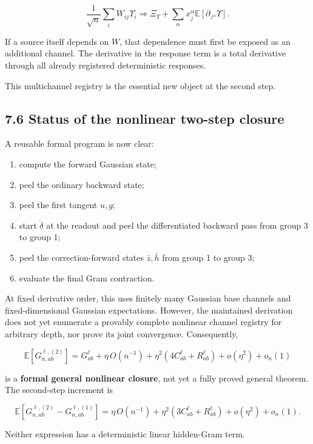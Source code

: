 \[
\frac1{\sqrt n}\sum_iW_{ij}\Upsilon_i
\Longrightarrow
\Xi_\Upsilon
+\sum_\alpha
x_j^\alpha\mathbb E[\partial_{z^\alpha}\Upsilon].
\]


If a source itself depends on \(W\), that dependence must first be exposed as
an additional channel. The derivative in the response term is a total
derivative through all already registered deterministic responses.

This multichannel registry is the essential new object at the second step.

\subsection*{7.6 Status of the nonlinear two-step closure}


A reusable formal program is now clear:

\begin{enumerate}
\item compute the forward Gaussian state;
\item peel the ordinary backward state;
\item peel the first tangent \(u,g\);
\item start \(\dot\delta\) at the readout and peel the differentiated backward
   pass from group 3 to group 1;
\item peel the correction-forward states \(\bar z,\bar h\) from group 1 to
   group 3;
\item evaluate the final Gram contraction.
\end{enumerate}


At fixed derivative order, this uses finitely many Gaussian base channels and
fixed-dimensional Gaussian expectations. However, the maintained derivation
does not yet enumerate a provably complete nonlinear channel registry for
arbitrary depth, nor prove its joint convergence. Consequently,

\[
\boxed{
\mathbb E[G^{\ell,(2)}_{n,ab}]
=
G^\ell_{ab}
+\eta\,O(n^{-1})
+\eta^2(4C^\ell_{ab}+R^\ell_{ab})
+o(\eta^2)+o_n(1)
}
\]


is a \textbf{formal general nonlinear closure}, not yet a fully proved general
theorem. The second-step increment is

\[
\boxed{
\mathbb E[G^{\ell,(2)}_{n,ab}-G^{\ell,(1)}_{n,ab}]
=
\eta\,O(n^{-1})
+\eta^2(3C^\ell_{ab}+R^\ell_{ab})
+o(\eta^2)+o_n(1).
}
\]


Neither expression has a deterministic linear hidden-Gram term.

